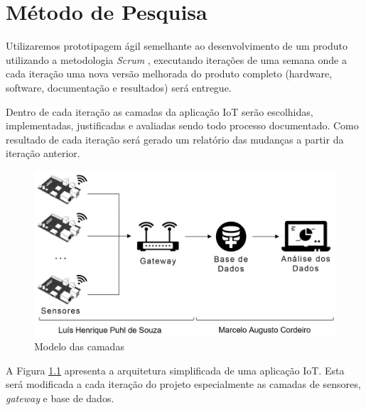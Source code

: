 \documentclass[
	12pt,				%
	openright,			%
	oneside,			%
	a4paper,			%
	chapter=TITLE,		%
	english,			%
	french,				%
	spanish,			%
	brazil				%
	]{abntex2}
\begin{document}
{%

\chapter{Método de Pesquisa}

Utilizaremos prototipagem ágil semelhante ao desenvolvimento de um produto utilizando a metodologia \textit{Scrum} \cite{James2016}, executando iterações de uma semana onde a cada iteração uma nova versão melhorada do produto completo (hardware, software, documentação e resultados) será entregue.

Dentro de cada iteração as camadas da aplicação IoT serão escolhidas, implementadas, justificadas e avaliadas sendo todo processo documentado. Como resultado de cada iteração será gerado um relatório das mudanças a partir da iteração anterior.

\begin{figure}[htb]
	\caption{\label{fig:projeto}Modelo das camadas }
	\begin{center}
		\includegraphics[width=1\textwidth]{img/projeto.JPG}
	\end{center}
\end{figure}

A Figura \ref{fig:projeto} apresenta a arquitetura simplificada de uma aplicação IoT. Esta será modificada a cada iteração do projeto especialmente as camadas de sensores, \textit{gateway} e base de dados.




}
\end{document}
